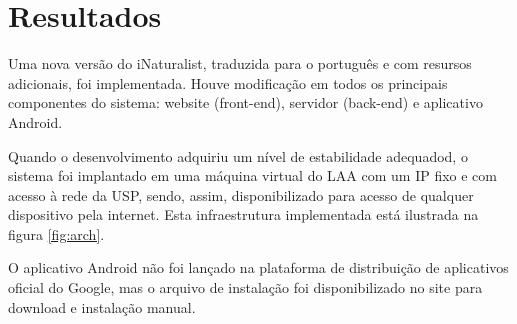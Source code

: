 \section{Resultados}
Uma nova versão do iNaturalist, traduzida para o português e com resursos adicionais, foi implementada. Houve modificação em todos os principais componentes do sistema: website (front-end), servidor (back-end) e aplicativo Android.

Quando o desenvolvimento adquiriu um nível de estabilidade adequadod, o sistema foi implantado em uma máquina virtual do LAA com um IP fixo e com acesso à rede da USP, sendo, assim, disponibilizado para acesso de qualquer dispositivo pela internet. Esta infraestrutura implementada está ilustrada na figura \ref{fig:arch}.

O aplicativo Android não foi lançado na plataforma de distribuição de aplicativos oficial do Google, mas o arquivo de instalação foi disponibilizado no site para download e instalação manual.
